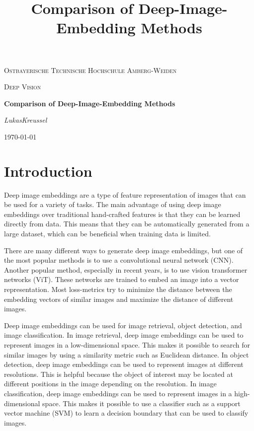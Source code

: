 \documentclass[12pt,a4paper]{report}
\newcommand*{\IhrVorname}{Lukas}
\newcommand*{\IhrNachname}{Kreussel}
\newcommand*{\IhreArbeit}{Comparison of Deep-Image-Embedding Methods }
\begin{document}
\begin{titlepage}
	\centering
	{\scshape\LARGE Ostbayerische Technische Hochschule Amberg-Weiden\par}
	\vspace{1cm}
	{\scshape\Large Deep Vision\par}
	\vspace{1.5cm}
    \title{\IhreArbeit}
	{\huge\bfseries \IhreArbeit \par}
	\vspace{2cm}
	{\Large\itshape \IhrVorname \space \IhrNachname \par}

	\vfill

	{\large \today\par}
\end{titlepage}

\newpage
\tableofcontents
\newpage
\chapter{Introduction}

Deep image embeddings are a type of feature representation of images that can be used for a variety of tasks.
The main advantage of using deep image embeddings over traditional hand-crafted features is that they can be learned directly from data.
This means that they can be automatically generated from a large dataset, which can be beneficial when training data is limited.


There are many different ways to generate deep image embeddings, but one of the most popular methods is to use a convolutional neural network (CNN).
Another popular method, especially in recent years, is to use vision transformer networks (ViT).
These networks are trained to embed an image into a vector representation.
Most loss-metrics try to minimize the distance between the embedding vectors of similar images and maximize the distance of different images.	

Deep image embeddings can be used for image retrieval, object detection, and image classification.
In image retrieval, deep image embeddings can be used to represent images in a low-dimensional space.
This makes it possible to search for similar images by using a similarity metric such as Euclidean distance.
In object detection, deep image embeddings can be used to represent images at different resolutions.
This is helpful because the object of interest may be located at different positions in the image depending on the resolution.
In image classification, deep image embeddings can be used to represent images in a high-dimensional space.
This makes it possible to use a classifier such as a support vector machine (SVM) to learn a decision boundary that can be used to classify images.
\end{document}
